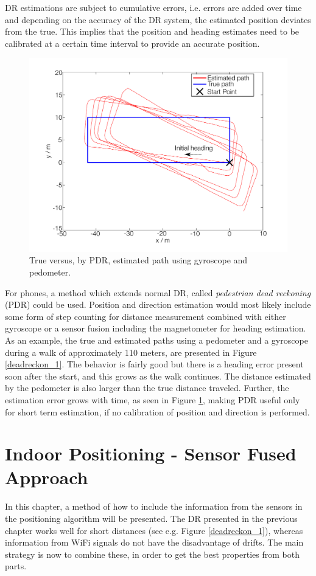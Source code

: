 \documentclass{LTHthesis}
\begin{document}
DR estimations are subject to cumulative errors, i.e. errors are added over time and depending on the accuracy of the DR system, the estimated position deviates from the true. This implies that the position and heading estimates need to be calibrated at a certain time interval to provide an accurate position.
%
\begin{figure}[!hbt]

\includegraphics[width=1\textwidth ]{images/kinematic/deadreckon_2}
\caption{True versus, by PDR, estimated path using gyroscope and pedometer.}\label{deadreckon_2}
\end{figure}
%
For phones, a method which extends normal DR, called \emph{pedestrian dead reckoning} (PDR) could be used. Position and direction estimation would most likely include some form of step counting for distance measurement combined with either gyroscope or a sensor fusion including the magnetometer for heading estimation. As an example, the true and estimated paths using a pedometer and a gyroscope during a walk of approximately 110 meters, are presented in Figure \ref{deadreckon_1}. The behavior is fairly good but there is a heading error present soon after the start, and this grows as the walk continues. The distance estimated by the pedometer is also larger than the true distance traveled. Further, the estimation error grows with time, as seen in Figure \ref{deadreckon_2}, making PDR useful only for short term estimation, if no calibration of position and direction is performed.  
%
\chapter{Indoor Positioning - Sensor Fused Approach} 
\label{chap:sensor_fused}
%
In this chapter, a method of how to include the information from the sensors in the positioning algorithm will be presented. The DR presented in the previous chapter works well for short distances (see e.g. Figure \ref{deadreckon_1}), whereas information from WiFi signals do not have the disadvantage of drifts. The main strategy is now to combine these, in order to get the best properties from both  parts.
\end{document}
